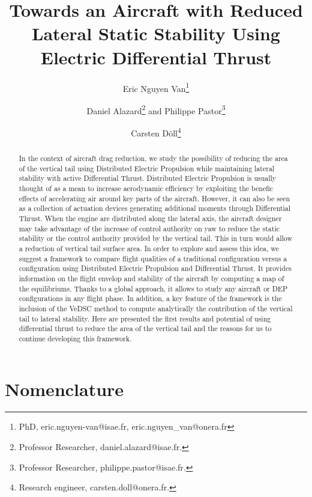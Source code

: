 \documentclass[journal]{new-aiaa}
\title{Towards an Aircraft with Reduced Lateral Static Stability Using Electric Differential Thrust}
\author{Eric Nguyen Van\footnote{PhD, eric.nguyen-van@isae.fr, eric.nguyen\_van@onera.fr}}
\affil{ISAE DCAS, Toulouse, France}
\affil{ONERA DTIS, Toulouse France}
\author{Daniel Alazard\footnote{Professor Researcher, daniel.alazard@isae.fr.} and Philippe Pastor\footnote{Professor Researcher, philippe.pastor@isae.fr.}}
\affil{ISAE DCAS, Toulouse, France}
\author{Carsten D\"oll\footnote{Research engineer, carsten.doll@onera.fr.}}
\affil{ONERA DTIS, Toulouse, France}
\begin{document}
\maketitle

\begin{abstract}
In the context of aircraft drag reduction, we study the possibility of reducing the area of the vertical tail using Distributed Electric Propulsion while maintaining lateral stability with active Differential Thrust. Distributed Electric Propulsion is usually thought of as a mean to increase aerodynamic efficiency by exploiting the benefic effects of accelerating air around key parts of the aircraft. However, it can also be seen as a collection of actuation devices generating additional moments through Differential Thrust. When the engine are distributed along the lateral axis, the aircraft designer may take advantage of the increase of control authority on yaw to reduce the static stability or the control authority provided by the vertical tail. This in turn would allow a reduction of vertical tail surface area. In order to explore and assess this idea, we suggest a framework to compare flight qualities of a traditional configuration versus a configuration using Distributed Electric Propulsion and Differential Thrust. It provides information on the flight envelop and stability of the aircraft by computing a map of the equilibriums. Thanks to a global approach, it allows to study any aircraft or DEP configurations in any flight phase. In addition, a key feature of the framework is the inclusion of the VeDSC method to compute analytically the contribution of the vertical tail to lateral stability. Here are presented the first results and potential of using differential thrust to reduce the area of the vertical tail and the reasons for us to continue developing this framework.
\end{abstract}

\clearpage

\section*{Nomenclature}

\end{document}
